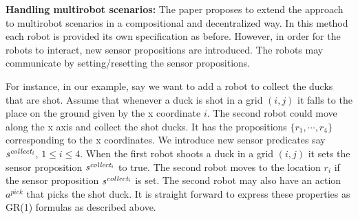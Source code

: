 \textbf{Handling multirobot scenarios:}
The paper proposes to extend the approach to multirobot scenarios in a compositional and decentralized way.
In this method each robot is provided its own specification as before. However, in order for the 
robots to interact, new sensor propositions are introduced. The robots may communicate by setting/resetting 
the sensor propositions.

For instance, in our example, say we want to add a robot to collect the ducks that are shot. Assume that
whenever a duck is shot in a grid $(i,j)$ it falls to the place on the ground given by the x coordinate 
$i$. The second robot could move along the x axis and collect the shot ducks.
It has the propositions $\{ r_1,\cdots,r_4 \}$  corresponding to the x coordinates.
We introduce  new sensor predicates say $\mathit{s^{collect_{i}}}$, $1 \le i \le 4$.
When the first robot shoots a duck in a grid $(i,j)$ it sets the sensor proposition $\mathit{s^{collect_{i}}}$ to
true. The second robot moves to the location $r_i$ if the sensor proposition $\mathit{s^{collect_{i}}}$ is set.
The second robot may also have an action $a^{pick}$  that picks the shot duck.
It is straight forward to express these properties as GR(1) formulas as described above.